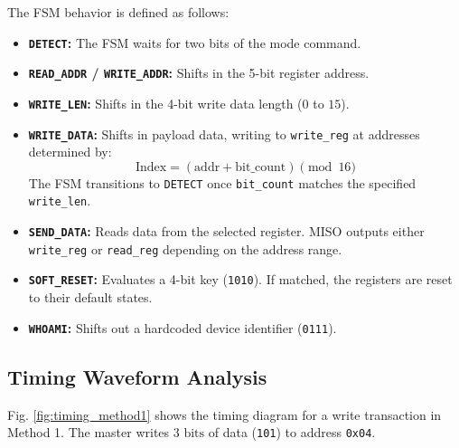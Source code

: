 \documentclass[conference]{IEEEtran}
\begin{document}
The FSM behavior is defined as follows:
\begin{itemize}
    \item \textbf{\texttt{DETECT}:} The FSM waits for two bits of the mode command.
    \item \textbf{\texttt{READ\_ADDR} / \texttt{WRITE\_ADDR}:} Shifts in the 5-bit register address.
    \item \textbf{\texttt{WRITE\_LEN}:} Shifts in the 4-bit write data length ($0$ to $15$).
    \item \textbf{\texttt{WRITE\_DATA}:} Shifts in payload data, writing to \texttt{write\_reg} at addresses determined by:
    \begin{equation}
        \text{Index} = (\text{addr} + \text{bit\_count}) \pmod{16}
    \end{equation}
    The FSM transitions to \texttt{DETECT} once \texttt{bit\_count} matches the specified \texttt{write\_len}.
    \item \textbf{\texttt{SEND\_DATA}:} Reads data from the selected register. MISO outputs either \texttt{write\_reg} or \texttt{read\_reg} depending on the address range.
    \item \textbf{\texttt{SOFT\_RESET}:} Evaluates a 4-bit key (\texttt{1010}). If matched, the registers are reset to their default states.
    \item \textbf{\texttt{WHOAMI}:} Shifts out a hardcoded device identifier (\texttt{0111}).
\end{itemize}

\subsection{Timing Waveform Analysis}
Fig. \ref{fig:timing_method1} shows the timing diagram for a write transaction in Method 1. The master writes $3\text{ bits}$ of data (\texttt{101}) to address \texttt{0x04}.
\end{document}
